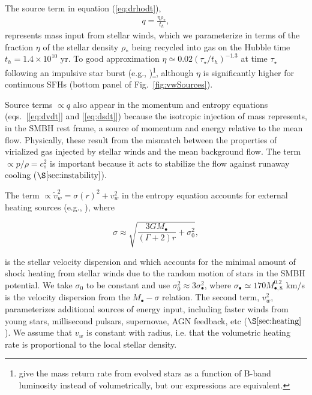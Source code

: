 \documentclass[usenatbib,fleqn]{mn2e}
\newcommand{\vw}{\tilde{v}_{w}}
\newcommand{\rhostar}{\rho_*}
\newcommand{\Mbh}[1][]{M_{\bullet#1}}
\newcommand{\Mbheight}{M_{\bullet,8}}
\renewcommand{\th}{t_h}
\begin{document}
The source term in equation (\ref{eq:drhodt}),
\begin{align}
  q=\frac{\eta \rhostar}{\th},
\label{eq:q}
\end{align}
represents mass input from stellar winds, which we parameterize in
terms of the fraction $\eta$ of the stellar density $\rhostar$ being
recycled into gas on the Hubble time $\th = 1.4 \times 10^{10}$ yr.
To good approximation $\eta\simeq 0.02 (\tau_{\star}/t_h)^{-1.3}$ at
time $\tau_{\star}$ following an impulsive star burst (e.g.,
\citealt{Ciotti+91})\footnote{\citet{Ciotti+91} give the mass return
  rate from evolved stars as a function of B-band luminosity instead
  of volumetrically, but our expressions are equivalent.}, although
$\eta$ is significantly higher for continuous SFHs
(bottom panel of Fig.~\ref{fig:vwSources}).

Source terms $\propto q$ also appear in the momentum and entropy
equations (eqs.~[\ref{eq:dvdt}] and [\ref{eq:dsdt}]) because the isotropic injection of mass represents, in the SMBH rest frame, a source of momentum
and energy relative to the mean flow.  Physically, these result from
the mismatch between the properties of virialized gas injected by stellar winds and the mean background flow.  The
term $\propto p/\rho = c_{s}^{2}$ is important because it acts to stabilize the flow against runaway cooling ($\S\ref{sec:instability}$).

The term $\propto \vw^2 = \sigma(r)^2+v_{w}^2$ in the entropy equation
accounts for external heating sources (e.g.,
\citealt{ShcherbakovWong+:2014a}), where

\begin{equation}
\sigma \approx \sqrt{\frac{3 G \Mbh}{(\Gamma+2)
    r}+\sigma_0^2},
\label{eq:sigmarel}
\end{equation}

is the stellar velocity dispersion and which accounts for the minimal
amount of shock heating from stellar winds due to the random motion of
stars in the SMBH potential. We take $\sigma_0$ to be constant and use
$\sigma_0^{2} \approx 3 \sigma_{\bullet}^2$, where
$\sigma_{\bullet}\simeq 170 \Mbheight^{0.2}$ km/s is the velocity
dispersion from the \citet{McConnellMa+:2011a} $\Mbh-\sigma$
relation.  The second term, $v_{w}^{2}$, parameterizes additional sources of
energy input, including faster winds from young stars, millisecond
pulsars, supernovae, AGN feedback, etc ($\S\ref{sec:heating}$).  We
assume that $v_w$ is constant with radius, i.e. that the volumetric
heating rate is proportional to the local stellar density.
\end{document}
